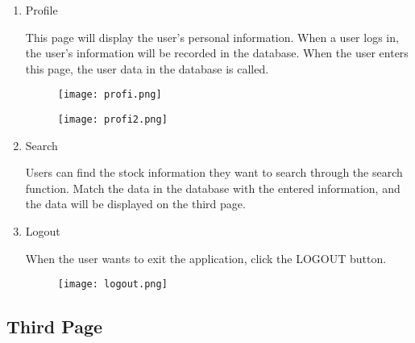 \documentclass[conference]{IEEEtran}
\begin{document}
        \begin{enumerate}
        \item Profile
        
        This page will display the user's personal information. When a user logs in, the user's information will be recorded in the database. When the user enters this page, the user data in the database is called.
        
        \begin{figure}[h]
        \begin{center}
        \centering
        \texttt{[image: profi.png]}
        \caption{}
        \label{fig:my_label}
        \end{center}
        \end{figure}
        
        \begin{figure}[h]
        \begin{center}
        \centering
        \texttt{[image: profi2.png]}
        \caption{}
        \label{fig:my_label}
        \end{center}
        \end{figure}
        
        
        \item Search
        
        Users can find the stock information they want to search through the search function. Match the data in the database with the entered information, and the data will be displayed on the third page.\vspace{1\baselineskip}
        
        \item Logout
        
        When the user wants to exit the application, click the LOGOUT button.\vspace{1\baselineskip}
        
        \begin{figure}[h]
        \begin{center}
        \centering
        \texttt{[image: logout.png]}
        \caption{}
        \label{fig:my_label}
        \end{center}
        \end{figure}
        \vspace{1\baselineskip}
        
     \end{enumerate}
     
     
    \subsection{Third Page} 
    
\end{document}
